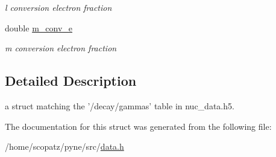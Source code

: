 \begin{DoxyCompactItemize}
\begin{DoxyCompactList}\small\item\em l conversion electron fraction \end{DoxyCompactList}\item 
\hypertarget{structpyne_1_1gamma_a6c664717050818947e2e79d75e914c41}{double \hyperlink{structpyne_1_1gamma_a6c664717050818947e2e79d75e914c41}{m\-\_\-conv\-\_\-e}}\label{structpyne_1_1gamma_a6c664717050818947e2e79d75e914c41}

\begin{DoxyCompactList}\small\item\em m conversion electron fraction \end{DoxyCompactList}\end{DoxyCompactItemize}


\subsection{Detailed Description}
a struct matching the '/decay/gammas' table in nuc\-\_\-data.\-h5. 

The documentation for this struct was generated from the following file\-:\begin{DoxyCompactItemize}
\item 
/home/scopatz/pyne/src/\hyperlink{data_8h}{data.\-h}\end{DoxyCompactItemize}
